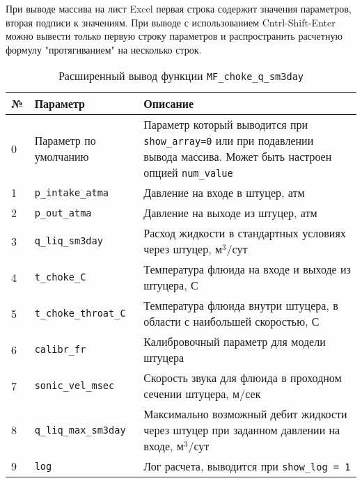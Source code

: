 При выводе массива на лист Excel первая строка содержит значения параметров, вторая подписи к значениям. При выводе с использованием Cntrl-Shift-Enter можно вывести только первую строку параметров и распространить расчетную формулу "протягиванием" на несколько строк.

\begin{table}[H]
	\caption{Расширенный вывод функции \texttt{MF_choke_q_sm3day}}
	\label{table:param_list_choke_q}
	\begin{tabular}{p{}p{}p{}}
		\hline
		№& Параметр & Описание  \\ \hline
		0 & Параметр по умолчанию & Параметр который выводится при \texttt{show_array=0} или при подавлении вывода массива. Может быть настроен опцией  \texttt{num_value}    \\ \hline
		
		1 & \texttt{p_intake_atma} & Давление на входе в штуцер, атм    \\ \hline
		2 & \texttt{p_out_atma} & Давление на выходе из штуцер, атм    \\ \hline
		3 & \texttt{q_liq_sm3day} & Расход жидкости в стандартных условиях через штуцер, м$^3$/сут    \\ \hline
		4 & \texttt{t_choke_C} & Температура флюида на входе и выходе из штуцера, С  \\ \hline
		5 & \texttt{t_choke_throat_C} & Температура флюида внутри штуцера, в области с наибольшей скоростью, С  \\ \hline
		6 & \texttt{calibr_fr} & Калибровочный параметр для модели штуцера  \\ \hline
		7 & \texttt{sonic_vel_msec} & Скорость звука для флюида в проходном сечении штуцера, м/сек  \\ \hline
		8 & \texttt{q_liq_max_sm3day} & Максимально возможный дебит жидкости через штуцер при заданном давлении на входе, м$^3$/сут  \\ \hline
		9 & \texttt{log} & Лог расчета, выводится при \texttt{show_log = 1}  \\ \hline
		
	\end{tabular}
\end{table}



